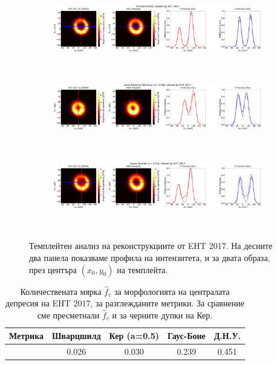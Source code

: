 \documentclass[12pt]{article}
\numberwithin{equation}{section}
\numberwithin{figure}{section}
\begin{document}
	 \begin{figure}[h!]
	 	\centering
	 	\begin{subfigure}{12cm}
	 		\hspace{-1.5cm}
	 		\includegraphics[scale = 0.13]{Section_8_Observing_Horizonless_Objects/Ehtim_Vida_plot_2017_230_Sch.png}
	 	\end{subfigure}\\
	 	\begin{subfigure}{12cm}
	 		\hspace{-1.5cm}
	 		\includegraphics[scale = 0.13]{Section_8_Observing_Horizonless_Objects/Ehtim_Vida_plot_2017_230_JNW.png}
	 	\end{subfigure}\\
	 	\begin{subfigure}{12cm}
	 		\hspace{-1.5cm}
	 		\includegraphics[scale = 0.13]{Section_8_Observing_Horizonless_Objects/Ehtim_Vida_plot_2017_230_GB.png}
	 	\end{subfigure}\\
	 	\label{VIDA_EHT_ng2017}
	 	\caption[Темплейтен анализ на реконструкциите от EHT 2017]{\small Темплейтен анализ на реконструкциите от EHT 2017. На десните два панела показваме профила на интензитета, и за двата образа, през центъра $(x_0,y_0)$ на темплейта.} 
	 \end{figure}
	 
	 \begin{table}[h!]
	 	\centering
	 	\begin{tabular}{||c|c|c|c|c||}
	 		\hline
	 		{Метрика} & {Шварцшилд}&{Кер (a=0.5)}&{Гаус-Боне}&{Д.Н.У.}
	 		\\\hline
	 		{\thead{$\hat{f}_c$}} & 0.026&0.030&0.239&0.451
	 		\\\hline
	 	\end{tabular}
	 	\caption[Количествената мярка $\hat{f}_c$ за морфологията на централата депресия на EHT 2017]{\small Количествената мярка $\hat{f}_c$ за морфологията на централата депресия на EHT 2017, за разглежданите метрики. За сравнение сме пресметнали $\hat{f}_c$ и за черните дупки на Кер.}
	 	\label{table:f_2017}
	 \end{table}
	 
\end{document}
